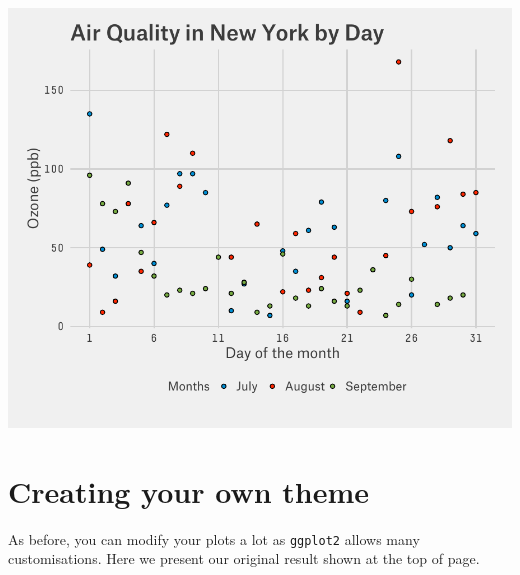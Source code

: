 \begin{center}\includegraphics[width=0.6\linewidth]{5_Scatter_Plots_pdf/scatter_15-1} \end{center}

\section{Creating your own theme}\label{creating-your-own-theme}

As before, you can modify your plots a lot as \texttt{ggplot2} allows
many customisations. Here we present our original result shown at the
top of page.

